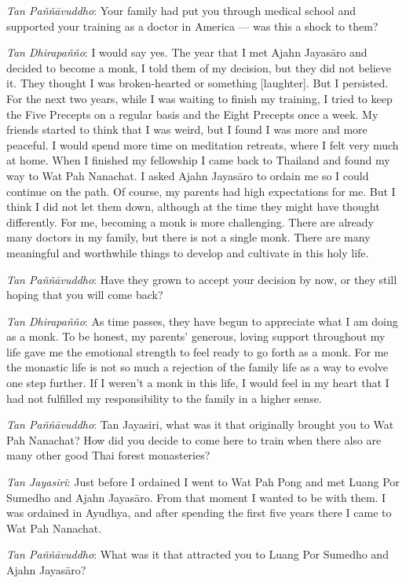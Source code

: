 \emph{Tan Paññāvuddho}‎: Your family had put you through medical school
and supported your training as a doctor in America --- was this a shock
to them?

\emph{Tan Dhirapañño}‎: I would say yes. The year that I met Ajahn
Jayasāro and decided to become a monk, I told them of my decision, but
they did not believe it. They thought I was broken-hearted or something
{[}laughter{]}. But I persisted. For the next two years, while I was
waiting to finish my training, I tried to keep the Five Precepts on a
regular basis and the Eight Precepts once a week. My friends started to
think that I was weird, but I found I was more and more peaceful. I
would spend more time on meditation retreats, where I felt very much at
home. When I finished my fellowship I came back to Thailand and found my
way to Wat Pah Nanachat. I asked Ajahn Jayasāro to ordain me so I could
continue on the path. Of course, my parents had high expectations for
me. But I think I did not let them down, although at the time they might
have thought differently. For me, becoming a monk is more challenging.
There are already many doctors in my family, but there is not a single
monk. There are many meaningful and worthwhile things to develop and
cultivate in this holy life.

\emph{Tan Paññāvuddho}‎: Have they grown to accept your decision by now,
or they still hoping that you will come back?

\emph{Tan Dhirapañño}‎: As time passes, they have begun to appreciate
what I am doing as a monk. To be honest, my parents' generous, loving
support throughout my life gave me the emotional strength to feel ready
to go forth as a monk. For me the monastic life is not so much a
rejection of the family life as a way to evolve one step further. If I
weren't a monk in this life, I would feel in my heart that I had not
fulfilled my responsibility to the family in a higher sense.

\emph{Tan Paññāvuddho}‎: Tan Jayasiri, what was it that originally
brought you to Wat Pah Nanachat? How did you decide to come here to
train when there also are many other good Thai forest monasteries?

\emph{Tan Jayasiri}: Just before I ordained I went to Wat Pah Pong and
met Luang Por Sumedho and Ajahn Jayasāro. From that moment I wanted to
be with them. I was ordained in Ayudhya, and after spending the first
five years there I came to Wat Pah Nanachat.

\emph{Tan Paññāvuddho}‎: What was it that attracted you to Luang Por
Sumedho and Ajahn Jayasāro?

